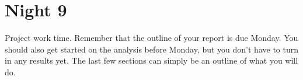 \chapter{Night 9}

Project work time. Remember that the outline of your report is due Monday. You should also get started on the analysis before Monday, but you don't have to turn in any results yet. The last few sections can simply be an outline of what you will do. 